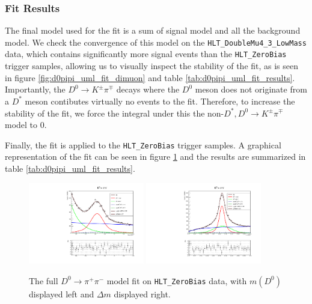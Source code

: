 \subsubsection{Fit Results}

The final model used for the fit is a sum of signal model and all the background model. We check the convergence of this model on the \texttt{HLT\_DoubleMu4\_3\_LowMass} data, which contains significantly more signal events than the \texttt{HLT\_ZeroBias} trigger samples, allowing us to visually inspect the stability of the fit, as is seen in figure \ref{fig:d0pipi_uml_fit_dimuon} and table \ref{tab:d0pipi_uml_fit_results}. Importantly, the $D^0 \to K^\pm \pi^\mp$ decays where the $D^0$ meson does not originate from a $D^*$ meson contibutes virtually no events to the fit. Therefore, to increase the stability of the fit, we force the integral under this the non-$D^*,D^0 \to K^\pm \pi^\mp$ model to 0. 

Finally, the fit is applied to the \texttt{HLT\_ZeroBias} trigger samples. A graphical representation of the fit can be seen in figure \ref{fig:d0pipi_uml_fit} and the results are summarized in table \ref{tab:d0pipi_uml_fit_results}.


\begin{figure}[htp]
    \begin{center}
      \includegraphics[width=0.45\textwidth]{figures/chapter4/normalization_fit/m_pipiDimuon_afterMvaCut.pdf}
      \includegraphics[width=0.45\textwidth]{figures/chapter4/normalization_fit/dm_pipiDimuon_afterMvaCut.pdf}\\
    \end{center}
    \caption{
        The full $D^0 \to \pi^+ \pi^-$ model fit on \texttt{HLT\_ZeroBias} data, with $m(D^0)$ displayed left and $\Delta m$ displayed right.
    }
    \label{fig:d0pipi_uml_fit}
\end{figure}

